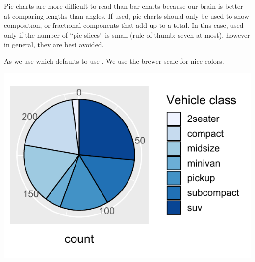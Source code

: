 \documentclass[krantz2]{krantz}\usepackage{knitr}
\begin{document}
\begin{warningbox}
Pie charts are more difficult to read than bar charts because our brain is better at comparing lengths than angles. If used, pie charts should only be used to show composition, or fractional components that add up to a total. In this case, used only if the number of “pie slices” is small (rule of thumb: seven at most), however in general, they are best avoided.
\end{warningbox}

As we use  which defaults to use . We use the brewer scale for nice colors.

\begin{knitrout}\footnotesize
{}\color{fgcolor}\begin{kframe}
\begin{alltt}
\hlstd{(}  \hlstd{(} \hlstd{=} \hlstd{(}\hlstd{),}  \hlstd{=}  \hlopt{+}
  \hlstd{(} \hlstd{=} \hlstd{,}  \hlstd{=} \hlstd{)} \hlopt{+}
  \hlstd{(} \hlstd{=} \hlstd{)} \hlopt{+}
  \hlstd{()} \hlopt{+}
  \hlstd{(} \hlstd{=} \hlstd{)} \hlopt{+}
  \hlstd{(} \hlstd{=} \hlstd{,}  \hlstd{=} \hlstd{)}
\end{alltt}
\end{kframe}

{\centering \includegraphics[width=.54\textwidth]{figure/pos-main-chunk-54-1}

}



\end{knitrout}
\end{document}
